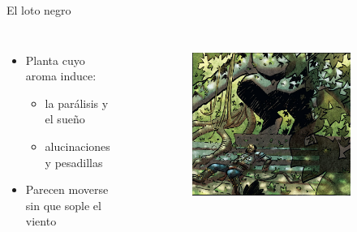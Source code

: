 \begin{frame}{El loto negro}
	\begin{columns}
		\begin{itemize}
			\item Planta cuyo aroma induce:
			\begin{itemize}
				\item la parálisis y el sueño
				\item alucinaciones y pesadillas
			\end{itemize}
			\item Parecen moverse sin que sople el viento
		\end{itemize}
		\begin{figure}[htp]
			\centering
			\begin{subfigure}[b]{0.3\textwidth}
				\includegraphics[width=\textwidth]{img/loto/Ablaze}
			\end{subfigure}
			~
			\begin{subfigure}[b]{0.27\textwidth}

\end{subfigure}
\end{figure}
\end{columns}
\end{frame}
